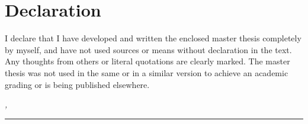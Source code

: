 %
\chapter*{Declaration}
\label{sec:declaration}
\thispagestyle{empty}

I declare that I have developed and written the enclosed master thesis completely by myself, and have not used sources or means without declaration in the text.
Any thoughts from others or literal quotations are clearly marked.
The master thesis was not used in the same or in a similar version to achieve an academic grading or is being published elsewhere.

\bigskip

\noindent\textit{\thesisUniversityCity, \thesisDate}

\smallskip

\begin{flushright}
	\begin{minipage}{5cm}
		\rule{\textwidth}{1pt}
		\centering\thesisName
	\end{minipage}
\end{flushright}

